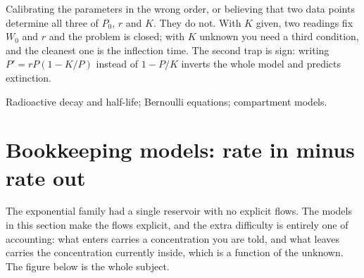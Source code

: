 \begin{trap}
Calibrating the parameters in the wrong order, or believing that two data points determine all three of $P_0$, $r$ and $K$. They do not. With $K$ given, two readings fix $W_0$ and $r$ and the problem is closed; with $K$ unknown you need a third condition, and the cleanest one is the inflection time. The second trap is sign: writing $P'=rP(1-K/P)$ instead of $1-P/K$ inverts the whole model and predicts extinction.
\end{trap}

\begin{seealsob}Radioactive decay and half-life; Bernoulli equations; compartment models.\end{seealsob}

\section{Bookkeeping models: rate in minus rate out}

The exponential family had a single reservoir with no explicit flows. The models in this section make the flows explicit, and the extra difficulty is entirely one of accounting: what enters carries a concentration you are told, and what leaves carries the concentration currently inside, which is a function of the unknown. The figure below is the whole subject.

\begin{center}
\end{center}

